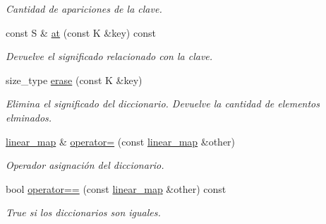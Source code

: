 \begin{DoxyCompactItemize}
\begin{DoxyCompactList}\small\item\em Cantidad de apariciones de la clave. \end{DoxyCompactList}\item 
const S \& \hyperlink{classlinear__map_a7bbfefc3467a2f178c069b3958e81c8a}{at} (const K \&key) const 
\begin{DoxyCompactList}\small\item\em Devuelve el significado relacionado con la clave. \end{DoxyCompactList}\item 
size\+\_\+type \hyperlink{classlinear__map_a932198aa420701fb84af74434764be9d}{erase} (const K \&key)
\begin{DoxyCompactList}\small\item\em Elimina el significado del diccionario. Devuelve la cantidad de elementos elminados. \end{DoxyCompactList}\item 
\hyperlink{classlinear__map}{linear\+\_\+map} \& \hyperlink{classlinear__map_a9868e2ada8b775c57521506fe7dd24a7}{operator=} (const \hyperlink{classlinear__map}{linear\+\_\+map} \&other)
\begin{DoxyCompactList}\small\item\em Operador asignación del diccionario. \end{DoxyCompactList}\item 
bool \hyperlink{classlinear__map_aba00da27993faf7b3bf2b2e42203afbf}{operator==} (const \hyperlink{classlinear__map}{linear\+\_\+map} \&other) const 
\begin{DoxyCompactList}\small\item\em True si los diccionarios son iguales. \end{DoxyCompactList}\end{DoxyCompactItemize}
